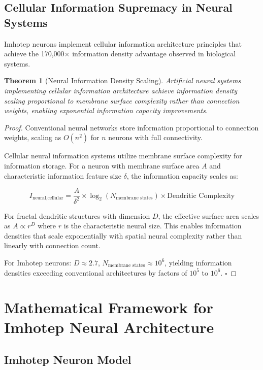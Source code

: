 \documentclass[12pt,a4paper]{article}
\newtheorem{theorem}{Theorem}[section]
\theoremstyle{remark}
\begin{document}
\subsection{Cellular Information Supremacy in Neural Systems}

Imhotep neurons implement cellular information architecture principles that achieve the 170,000× information density advantage observed in biological systems.

\begin{theorem}[Neural Information Density Scaling]
Artificial neural systems implementing cellular information architecture achieve information density scaling proportional to membrane surface complexity rather than connection weights, enabling exponential information capacity improvements.
\end{theorem}

\begin{proof}
Conventional neural networks store information proportional to connection weights, scaling as $O(n^2)$ for $n$ neurons with full connectivity.

Cellular neural information systems utilize membrane surface complexity for information storage. For a neuron with membrane surface area $A$ and characteristic information feature size $\delta$, the information capacity scales as:

\begin{equation}
I_{\text{neural,cellular}} = \frac{A}{\delta^2} \times \log_2(N_{\text{membrane states}}) \times \text{Dendritic Complexity}
\end{equation}

For fractal dendritic structures with dimension $D$, the effective surface area scales as $A \propto r^D$ where $r$ is the characteristic neural size. This enables information densities that scale exponentially with spatial neural complexity rather than linearly with connection count.

For Imhotep neurons: $D \approx 2.7$, $N_{\text{membrane states}} \approx 10^6$, yielding information densities exceeding conventional architectures by factors of $10^5$ to $10^6$. $\square$
\end{proof}

\section{Mathematical Framework for Imhotep Neural Architecture}

\subsection{Imhotep Neuron Model}
\end{document}
